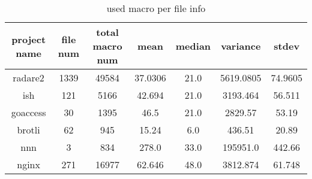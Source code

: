 \begin{table}[h]
	\caption{used macro per file info}
	\label{table:used_macro_info}	
		\begin{tabular}{ccccccc}
		\hline
		project name & file num & total macro num & mean & median & variance & stdev \\ 
		\hline \hline
		radare2 & 1339 & 49584 & 37.0306 & 21.0 & 5619.0805 & 74.9605 \\ 
		\hline
		ish & 121 & 5166 & 42.694 & 21.0 & 3193.464 & 56.511 \\ 
		\hline
		goaccess & 30 & 1395 & 46.5 & 21.0 & 2829.57 & 53.19 \\ 
		\hline
		brotli & 62 & 945 & 15.24 & 6.0 & 436.51 & 20.89 \\ 
		\hline
		nnn & 3 & 834 & 278.0 & 33.0 & 195951.0 & 442.66 \\ 
		\hline
		nginx & 271 & 16977 & 62.646 & 48.0 & 3812.874 & 61.748 \\ 
		\hline
	\end{tabular}
\end{table}